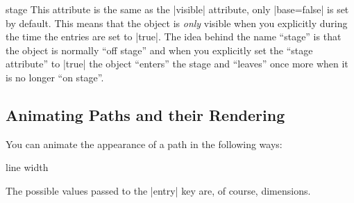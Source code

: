 \begin{animateattribute}{stage}
    This attribute is the same as the |visible| attribute, only |base=false| is
    set by default. This means that the object is \emph{only} visible when you
    explicitly during the time the entries are set to |true|. The idea behind
    the name ``stage'' is that the object is normally ``off stage'' and when
    you explicitly set the ``stage attribute'' to |true| the object ``enters''
    the stage and ``leaves'' once more when it is no longer ``on stage''.
\begin{codeexample}[
    preamble={\usepgfmodule{animations}},
    animation list={-1,0,1,2,3},
    animation bb={(1.3,-0.7) rectangle (2.7,0.7)},
]
\end{codeexample}
\end{animateattribute}


\subsection{Animating Paths and their Rendering}
\label{section-base-animation-paths}

You can animate the appearance of a path in the following ways:

\begin{animateattribute}{line width}
\begin{codeexample}[
    preamble={\usepgfmodule{animations}},
    animation list={0.5,1,1.5,2},
]
\end{codeexample}
    The possible values passed to the |entry| key are, of course, dimensions.
\end{animateattribute}

